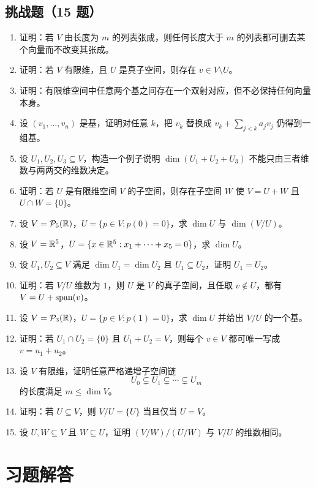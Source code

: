 \subsection*{挑战题（15 题）}

\begin{enumerate}[label=\textbf{\hard\ \arabic*.}, leftmargin=3em]
\item 证明：若 $V$ 由长度为 $m$ 的列表张成，则任何长度大于 $m$ 的列表都可删去某个向量而不改变其张成。
\item 证明：若 $V$ 有限维，且 $U$ 是真子空间，则存在 $v\in V\setminus U$。
\item 证明：有限维空间中任意两个基之间存在一个双射对应，但不必保持任何向量本身。
\item 设 $(v_1,\dots,v_n)$ 是基，证明对任意 $k$，把 $v_k$ 替换成 $v_k+\sum_{j<k}a_jv_j$ 仍得到一组基。
\item 设 $U_1,U_2,U_3\subseteq V$，构造一个例子说明 $\dim(U_1+U_2+U_3)$ 不能只由三者维数与两两交的维数决定。
\item 证明：若 $U$ 是有限维空间 $V$ 的子空间，则存在子空间 $W$ 使 $V=U+W$ 且 $U\cap W=\{0\}$。
\item 设 $V=\mathcal{P}_5(\mathbb{R})$，$U=\{p\in V:p(0)=0\}$，求 $\dim U$ 与 $\dim(V/U)$。
\item 设 $V=\mathbb{R}^5$，$U=\{x\in\mathbb{R}^5:x_1+\cdots+x_5=0\}$，求 $\dim U$。
\item 设 $U_1,U_2\subseteq V$ 满足 $\dim U_1=\dim U_2$ 且 $U_1\subseteq U_2$，证明 $U_1=U_2$。
\item 证明：若 $V/U$ 维数为 $1$，则 $U$ 是 $V$ 的真子空间，且任取 $v\notin U$，都有 $V=U+\operatorname{span}(v)$。
\item 设 $V=\mathcal{P}_3(\mathbb{R})$，$U=\{p\in V:p(1)=0\}$，求 $\dim U$ 并给出 $V/U$ 的一个基。
\item 证明：若 $U_1\cap U_2=\{0\}$ 且 $U_1+U_2=V$，则每个 $v\in V$ 都可唯一写成 $v=u_1+u_2$。
\item 设 $V$ 有限维，证明任意严格递增子空间链
\[ U_0\subsetneq U_1\subsetneq\cdots\subsetneq U_m \]
的长度满足 $m\le\dim V$。
\item 证明：若 $U\subseteq V$，则 $V/U=\{U\}$ 当且仅当 $U=V$。
\item 设 $U,W\subseteq V$ 且 $W\subseteq U$，证明 $(V/W)/(U/W)$ 与 $V/U$ 的维数相同。
\end{enumerate}

\section*{习题解答}


